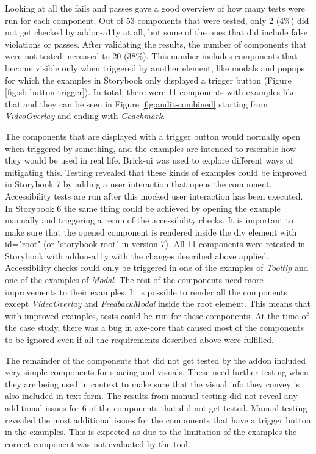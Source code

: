 \documentclass{master_thesis}
\begin{document}
Looking at all the fails and passes gave a good overview of how many tests were run for each component. Out of 53 components that were tested, only 2 (4\%) did not get checked by addon-a11y at all, but some of the ones that did include false violations or passes. After validating the results, the number of components that were not tested increased to 20 (38\%). This number includes components that become visible only when triggered by another element, like modals and popups for which the examples in Storybook only displayed a trigger button (Figure \ref{fig:sb-button-trigger}). In total, there were 11 components with examples like that and they can be seen in Figure \ref{fig:audit-combined} starting from \textit{VideoOverlay} and ending with \textit{Coachmark}.

The components that are displayed with a trigger button would normally open when triggered by something, and the examples are intended to resemble how they would be used in real life. Brick-ui was used to explore different ways of mitigating this. Testing revealed that these kinds of examples could be improved in Storybook 7 by adding a user interaction that opens the component. Accessibility tests are run after this mocked user interaction has been executed. In Storybook 6 the same thing could be achieved by opening the example manually and triggering a rerun of the accessibility checks. It is important to make sure that the opened component is rendered inside the div element with id="root" (or "storybook-root" in version 7). All 11 components were retested in Storybook with addon-a11y with the changes described above applied. Accessibility checks could only be triggered in one of the examples of \textit{Tooltip} and one of the examples of \textit{Modal}. The rest of the components need more improvements to their examples. It is possible to render all the components except \textit{VideoOverlay} and \textit{FeedbackModal} inside the root element. This means that with improved examples, tests could be run for these components. At the time of the case study, there was a bug in axe-core that caused most of the components to be ignored even if all the requirements described above were fulfilled.

The remainder of the components that did not get tested by the addon included very simple components for spacing and visuals. These need further testing when they are being used in context to make sure that the visual info they convey is also included in text form. The results from manual testing did not reveal any additional issues for 6 of the components that did not get tested. Manual testing revealed the most additional issues for the components that have a trigger button in the examples. This is expected as due to the limitation of the examples the correct component was not evaluated by the tool.
\end{document}

